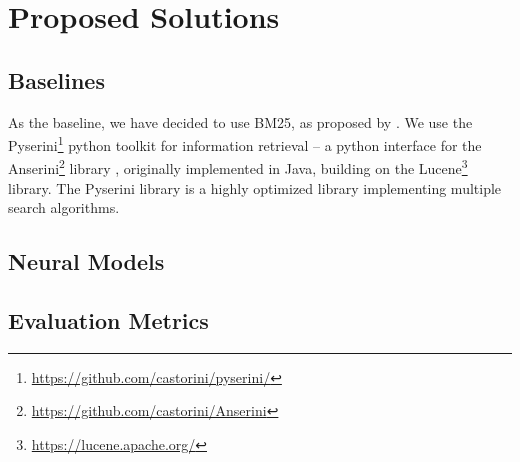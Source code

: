 \chapter{Proposed Solutions}

\section{Baselines}

As the baseline, we have decided to use BM25, as proposed by \citet{weak-baselines}.
We use the Pyserini\footnote{\url{https://github.com/castorini/pyserini/}} python toolkit for information retrieval \citep{pyserini} -- a python interface for the Anserini\footnote{\url{https://github.com/castorini/Anserini}} library \citep{anserini1, anserini2}, originally implemented in Java, building on the Lucene\footnote{\url{https://lucene.apache.org/}} library.
The Pyserini library is a highly optimized library implementing multiple search algorithms.

\section{Neural Models}

\section{Evaluation Metrics}

